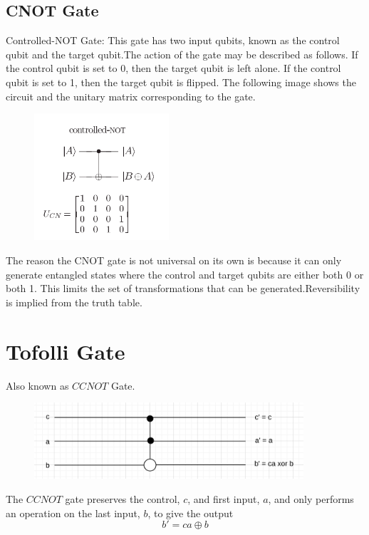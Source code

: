 \documentclass{article}
\begin{document}
\subsection{CNOT Gate}
Controlled-NOT Gate: This gate has two input qubits, known as the control qubit and the target qubit.The action of the gate may be described as follows. If the control qubit is set to 0, then the target qubit is left alone. If the control qubit is set to 1, then the target qubit is flipped. The following image shows the circuit and the unitary matrix corresponding to the gate.

\begin{figure}[htp]
	\includegraphics[width=5cm]{cnot.png}
\end{figure}

The reason the CNOT gate is not universal on its own is because it can only generate entangled states where the control and target qubits are either both 0 or both 1. This limits the set of transformations that can be generated.Reversibility is implied from the truth table.

\section{Tofolli Gate}

Also known as $CCNOT$ Gate.

\begin{figure}[htp]
    \centering
    \includegraphics[width=10cm]{tofolli.png}
\end{figure}

The $CCNOT$ gate preserves the control, $c$, and first input, $a$, and only performs an operation on the last input, $b$, to give the output $$b'=ca \oplus b$$
\end{document}
